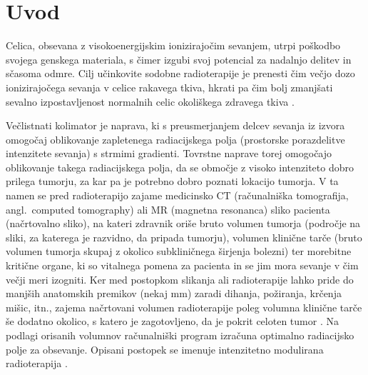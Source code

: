 \documentclass[journal]{IEEEtran}
\begin{document}
\section{Uvod}

Celica, obsevana z visokoenergijskim ionizirajočim sevanjem, utrpi poškodbo svojega genskega materiala, s čimer izgubi svoj potencial za nadalnjo delitev in sčasoma odmre. Cilj učinkovite sodobne radioterapije je prenesti čim večjo dozo ionizirajočega sevanja v celice rakavega tkiva, hkrati pa čim bolj zmanjšati sevalno izpostavljenost normalnih celic okoliškega zdravega tkiva \cite{baskar2012}.

Večlistnati kolimator je naprava, ki s preusmerjanjem delcev sevanja iz izvora omogočaj oblikovanje zapletenega radiacijskega polja (prostorske porazdelitve intenzitete sevanja) s strmimi gradienti. Tovrstne naprave torej omogočajo oblikovanje takega radiacijskega polja, da se območje z visoko intenziteto dobro prilega tumorju, za kar pa je potrebno dobro poznati lokacijo tumorja. V ta namen se pred radioterapijo zajame medicinsko CT (računalniška tomografija, angl.~computed tomography) ali MR (magnetna resonanca) sliko pacienta (načrtovalno sliko), na kateri zdravnik oriše bruto volumen tumorja (področje na sliki, za katerega je razvidno, da pripada tumorju), volumen klinične tarče (bruto volumen tumorja skupaj z okolico subkliničnega širjenja bolezni) ter morebitne kritične organe, ki so vitalnega pomena za pacienta in se jim mora sevanje v čim večji meri izogniti. Ker med postopkom slikanja ali radioterapije lahko pride do manjših anatomskih premikov (nekaj mm) zaradi dihanja, požiranja, krčenja mišic, itn., zajema načrtovani volumen radioterapije poleg volumna klinične tarče še dodatno okolico, s katero je zagotovljeno, da je pokrit celoten tumor \cite{burnet2004}. Na podlagi orisanih volumnov računalniški program izračuna optimalno radiacijsko polje za obsevanje. Opisani postopek se imenuje intenzitetno modulirana radioterapija \cite{jaffray2012}.
\end{document}
